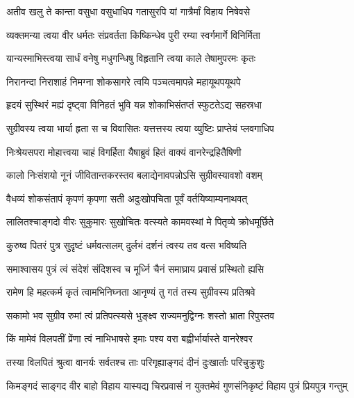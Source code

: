 \twolineshloka
{अतीव खलु ते कान्ता वसुधा वसुधाधिप}
{गतासुरपि यां गात्रैर्मां विहाय निषेवसे} %

\twolineshloka
{व्यक्तमन्या त्वया वीर धर्मतः संप्रवर्तता}
{किष्किन्धेव पुरी रम्या स्वर्गमार्गे विनिर्मिता} %

\twolineshloka
{यान्यस्माभिस्त्वया सार्धं वनेषु मधुगन्धिषु}
{विहृतानि त्वया काले तेषामुपरमः कृतः} %

\twolineshloka
{निरानन्दा निराशाहं निमग्ना शोकसागरे}
{त्वयि पञ्चत्वमापन्ने महायूथपयूथपे} %

\twolineshloka
{हृदयं सुस्थिरं मह्यं दृष्ट्वा विनिहतं भुवि}
{यन्न शोकाभिसंतप्तं स्फुटतेऽद्य सहस्रधा} %

\twolineshloka
{सुग्रीवस्य त्वया भार्या हृता स च विवासितः}
{यत्तत्तस्य त्वया व्युष्टिः प्राप्तेयं प्लवगाधिप} %

\twolineshloka
{निःश्रेयसपरा मोहात्त्वया चाहं विगर्हिता}
{यैषाब्रुवं हितं वाक्यं वानरेन्द्रहितैषिणी} %

\twolineshloka
{कालो निःसंशयो नूनं जीवितान्तकरस्तव}
{बलाद्येनावपन्नोऽसि सुग्रीवस्यावशो वशम्} %

\twolineshloka
{वैधव्यं शोकसंतापं कृपणं कृपणा सती}
{अदुःखोपचिता पूर्वं वर्तयिष्याम्यनाथवत्} %

\twolineshloka
{लालितश्चाङ्गदो वीरः सुकुमारः सुखोचितः}
{वत्स्यते कामवस्थां मे पितृव्ये क्रोधमूर्छिते} %

\twolineshloka
{कुरुष्व पितरं पुत्र सुदृष्टं धर्मवत्सलम्}
{दुर्लभं दर्शनं त्वस्य तव वत्स भविष्यति} %

\twolineshloka
{समाश्वासय पुत्रं त्वं संदेशं संदिशस्व च}
{मूर्ध्नि चैनं समाघ्राय प्रवासं प्रस्थितो ह्यसि} %

\twolineshloka
{रामेण हि महत्कर्म कृतं त्वामभिनिघ्नता}
{आनृण्यं तु गतं तस्य सुग्रीवस्य प्रतिश्रवे} %

\twolineshloka
{सकामो भव सुग्रीव रुमां त्वं प्रतिपत्स्यसे}
{भुङ्क्ष्व राज्यमनुद्विग्नः शस्तो भ्राता रिपुस्तव} %

\twolineshloka
{किं मामेवं विलपतीं प्रेंणा त्वं नाभिभाषसे}
{इमाः पश्य वरा बह्वीर्भार्यास्ते वानरेश्वर} %

\twolineshloka
{तस्या विलपितं श्रुत्वा वानर्यः सर्वतश्च ताः}
{परिगृह्याङ्गदं दीनं दुःखार्ताः परिचुक्रुशुः} %

\fourlineindentedshloka
{किमङ्गदं साङ्गद वीर बाहो}
{ विहाय यास्यद्य चिरप्रवासं}
{न युक्तमेवं गुणसंनिकृष्टं}
{ विहाय पुत्रं प्रियपुत्र गन्तुम्} %

